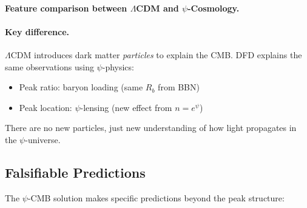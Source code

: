 \paragraph{Feature comparison between $\Lambda$CDM and $\psi$-Cosmology.}

\begin{center}
\renewcommand{\arraystretch}{1.3}%
\end{center}

\paragraph{Key difference.}
$\Lambda$CDM introduces dark matter \textit{particles} to explain the CMB. DFD explains the same observations using $\psi$-physics:
\begin{itemize}[nosep]
\item Peak ratio: baryon loading (same $R_b$ from BBN)
\item Peak location: $\psi$-lensing (new effect from $n = e^\psi$)
\end{itemize}

There are no new particles, just new understanding of how light propagates in the $\psi$-universe.

\subsection{Falsifiable Predictions}\label{app:cmb-predictions}

The $\psi$-CMB solution makes specific predictions beyond the peak structure:

